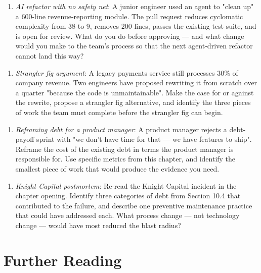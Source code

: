 \documentclass[11pt,a4paper]{book}
\begin{document}
\begin{enumerate}
  \item \textit{AI refactor with no safety net}: A junior engineer used an agent to "clean up" a 600-line revenue-reporting module. The pull request reduces cyclomatic complexity from 38 to 9, removes 200 lines, passes the existing test suite, and is open for review. What do you do before approving --- and what change would you make to the team's process so that the next agent-driven refactor cannot land this way?
\end{enumerate}

\begin{enumerate}
  \item \textit{Strangler fig argument}: A legacy payments service still processes 30\% of company revenue. Two engineers have proposed rewriting it from scratch over a quarter "because the code is unmaintainable". Make the case for or against the rewrite, propose a strangler fig alternative, and identify the three pieces of work the team must complete before the strangler fig can begin.
\end{enumerate}

\begin{enumerate}
  \item \textit{Reframing debt for a product manager}: A product manager rejects a debt-payoff sprint with "we don't have time for that --- we have features to ship". Reframe the cost of the existing debt in terms the product manager is responsible for. Use specific metrics from this chapter, and identify the smallest piece of work that would produce the evidence you need.
\end{enumerate}

\begin{enumerate}
  \item \textit{Knight Capital postmortem}: Re-read the Knight Capital incident in the chapter opening. Identify three categories of debt from Section 10.4 that contributed to the failure, and describe one preventive maintenance practice that could have addressed each. What process change --- not technology change --- would have most reduced the blast radius?
\end{enumerate}

\medskip

\section{Further Reading}
\end{document}
